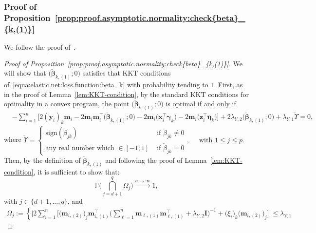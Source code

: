 \documentclass[
  12pt]{article}
\def\M{\mathbf{m}}
\def\X{\mathbf{x}}
\def\Y{\mathbf{y}}
\def\Z{\mathbf{z}}
\begin{document}
\subsubsection{Proof of Proposition~\ref{prop:proof.asymptotic.normality:check{beta}_{k,(1)}} }
\label{sec:proof:prop:proof.asymptotic.normality:check{beta}_{k,(1)}}
We follow the proof of~\cite[Theorem 3.2]{Zou-Zhang:2009}. 
\begin{proof}[Proof of Proposition~\ref{prop:proof.asymptotic.normality:check{beta}_{k,(1)}}]
	We will show that $\big( \check{\bm{\beta}}_{k,(1)} ; 0 \big)$ satisfies that KKT conditions of~\eqref{equa:elastic.net:loss.function:beta_k} with probability tending to $1$. 
	First, as in the proof of Lemma~\ref{lem:KKT-condition}, by the standard KKT conditions for optimality in a convex program, the point $\big( \check{\bm{\beta}}_{k,(1)} ; 0 \big)$ is optimal if and only if 
	\begin{align*}
		& -  \sum_{i=1}^{n} \Big[ 2 (\Y_{i})_{k} \M_{i}  -   2 \M_{i} \M_{i}^{\top}  \big( \check{\bm{\beta}}_{k,(1)} ; 0 \big)  - 2 \M_{i} \big( \X_{i}^{\top} \bm{\gamma}_{k} \big) - 2 \M_{i} \big(   \Z_{i}^{\top}\bm{\eta}_{k} \big) \Big] 
		+ 2 \lambda_{Y,2}   \big( \check{\bm{\beta}}_{k,(1)} ; 0 \big) + \lambda_{Y,1}   \check{ \Upsilon }   
		=  0,    
	\end{align*} 
	where 
$
		\check{ \Upsilon }   =  \left\{  \begin{array}{ll}
			\textrm{sign}(\check{\beta}_{jk})	&  \textrm{ if }  \check{\beta}_{jk}  \neq  0
			\\[0.2cm]   
			\textrm{any real number which } \in [-1 ; 1] 	&  \textrm{ if }  \check{\beta}_{jk}  =  0
		\end{array}
		\right. , \quad  \textrm{  with  }  1  \leq  j  \leq  p .   
$
	\\
	Then, by the definition of $\check{\bm{\beta}}_{k,(1)}$ and following the proof of Lemma~\ref{lem:KKT-condition}, it is sufficient to show that:
	\[
	\mathbb{P} \Bigg(  \bigcap_{j = d+1}^{q} \Omega_{j} \Bigg)   \overset{ n   \rightarrow  \infty    }{\longrightarrow}  1, \] 
	with $j \in \{ d+1, ..., q \}$, and
	\begin{align}
		\Omega_{j}  :=  \left\{  \Big| 2   \sum_{i=1}^{n} \Big[  \big( \M_{i,(2)} \big)_{j} \M_{i,(1)}^{\top}  \big( \sum_{\ell = 1}^{n} \M_{\ell , (1)} \M_{\ell , (1) }^{ \top } + \lambda_{Y, 2} \mathbf{I} \big)^{-1} +   \big(  \xi_{i}   \big)_{k}    \big( \M_{i,(2)} \big)_{j}    \Big]   \Big|  \leq     \lambda_{Y,1}  

\end{align}
\end{proof}
\end{document}
